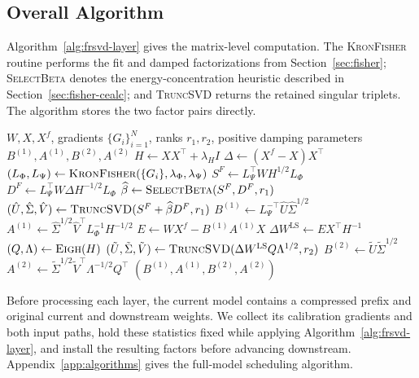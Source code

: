 \documentclass[11pt]{article}
\begin{document}
\subsection{Overall Algorithm}\label{sec:overall-algo}

Algorithm~\ref{alg:frsvd-layer} gives the matrix-level computation. The \textsc{KronFisher} routine performs the fit and damped factorizations from Section~\ref{sec:fisher}; \textsc{SelectBeta} denotes the energy-concentration heuristic described in Section~\ref{sec:fisher-cealc}; and \textsc{TruncSVD} returns the retained singular triplets. The algorithm stores the two factor pairs directly.

\begin{algorithm}[t]
\caption{FR-SVD for one weight matrix}
\label{alg:frsvd-layer}
\small
\begin{algorithmic}[1]
\Require $W,X,X^f$, gradients $\{G_i\}_{i=1}^N$, ranks $r_1,r_2$, positive damping parameters
\Ensure $B^{(1)},A^{(1)},B^{(2)},A^{(2)}$
\State $H\gets XX^\top+\lambda_H I$
\State $\Delta\gets(X^f-X)X^\top$
\State $(L_\Phi,L_\Psi)\gets\Call{KronFisher}{\{G_i\},\lambda_\Phi,\lambda_\Psi}$
\State $S^F\gets L_\Psi^\top WH^{1/2}L_\Phi$
\State $D^F\gets L_\Psi^\top W\Delta H^{-1/2}L_\Phi$
\State $\widehat\beta\gets\Call{SelectBeta}{S^F,D^F,r_1}$
\State $(\hat U,\hat\Sigma,\hat V)\gets\Call{TruncSVD}{S^F+\widehat\beta D^F,r_1}$
\State $B^{(1)}\gets L_\Psi^{-\top}\hat U\hat\Sigma^{1/2}$
\State $A^{(1)}\gets\hat\Sigma^{1/2}\hat V^\top L_\Phi^{-1}H^{-1/2}$
\EndStage
{}
\State $E\gets WX^f-B^{(1)}A^{(1)}X$
\State $\Delta W^{\mathrm{LS}}\gets EX^\top H^{-1}$
\State $(Q,\Lambda)\gets\Call{Eigh}{H}$
\State $(\tilde U,\tilde\Sigma,\tilde V)\gets\Call{TruncSVD}{\Delta W^{\mathrm{LS}}Q\Lambda^{1/2},r_2}$
\State $B^{(2)}\gets\tilde U\tilde\Sigma^{1/2}$
\State $A^{(2)}\gets\tilde\Sigma^{1/2}\tilde V^\top\Lambda^{-1/2}Q^\top$
\EndStage
\State \Return $(B^{(1)},A^{(1)},B^{(2)},A^{(2)})$
\end{algorithmic}
\end{algorithm}

Before processing each layer, the current model contains a compressed prefix and original current and downstream weights. We collect its calibration gradients and both input paths, hold these statistics fixed while applying Algorithm~\ref{alg:frsvd-layer}, and install the resulting factors before advancing downstream. Appendix~\ref{app:algorithms} gives the full-model scheduling algorithm.
\end{document}
